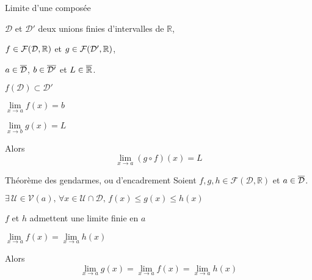     \begin{prop}{Limite d’une composée}{}
        \begin{soient}
            \item $\mathcal{D}$ et $\mathcal{D'}$ deux unions finies d’intervalles de $\mathbb{R}$,
            \item $f \in \mathcal{F}(\mathcal{D},\mathbb{R})$ et $g \in \mathcal{F}(\mathcal{D'},\mathbb{R})$,
            \item $a \in \overline{\mathcal{D}}$, $b \in \overline{\mathcal{D'}}$ et $L \in \overline{\mathbb{R}}$.
        \end{soient}
        \begin{suppose}
            \item $f(\mathcal{D}) \subset \mathcal{D'}$
            \item $\underset{x \rightarrow a}{\lim} f(x) = b$
            \item $\underset{x \rightarrow b}{\lim} g(x) = L$
        \end{suppose}
        Alors 
        \[ \underset{x \rightarrow a}{\lim} (g \circ f)(x) = L \]
    \end{prop}

    \begin{theo}{Théorème des gendarmes, ou d’encadrement}{}
        Soient $f,g,h \in \mathcal{F}(\mathcal{D},\mathbb{R})$ et $a \in \overline{\mathcal{D}}$.
    
        \begin{suppose}
            \item $\exists \, \mathcal{U} \in \mathcal{V}(a), \, \forall x \in \mathcal{U} \cap \mathcal{D}, \, f(x) \leq g(x) \leq h(x)$
            \item $f$ et $h$ admettent une limite finie en $a$
            \item $\underset{x \rightarrow a}{\lim} f(x) = \underset{x \rightarrow a}{\lim} h(x)$
        \end{suppose}
        Alors \[ \underset{x \rightarrow a}{\lim} g(x) = \underset{x \rightarrow a}{\lim} f(x) = \underset{x \rightarrow a}{\lim} h(x) \]
    \end{theo}

